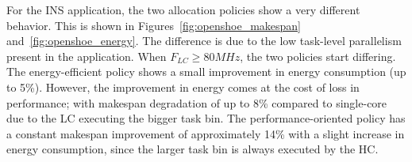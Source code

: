 For the INS application, the two allocation policies show a very different behavior. This is shown in Figures~\ref{fig:openshoe_makespan} and~\ref{fig:openshoe_energy}. The difference is due to the low task-level parallelism present in the application. When $F_{LC} \geq 80MHz$, the two policies start differing. The energy-efficient policy shows a small improvement in energy consumption (up to 5\%). However, the improvement in energy comes at the cost of loss in performance; with makespan degradation of up to 8\% compared to single-core due to the LC executing the bigger task bin. The performance-oriented policy has a constant makespan improvement of approximately 14\% with a slight increase in energy consumption, since the larger task bin is always executed by the HC. %



%

